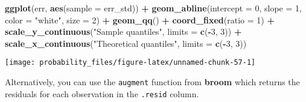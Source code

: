 \documentclass[]{book}
\newenvironment{Shaded}{\begin{snugshade}}{\end{snugshade}}
\newcommand{\DataTypeTok}[1]{\textcolor[rgb]{0.13,0.29,0.53}{#1}}
\newcommand{\DecValTok}[1]{\textcolor[rgb]{0.00,0.00,0.81}{#1}}
\newcommand{\KeywordTok}[1]{\textcolor[rgb]{0.13,0.29,0.53}{\textbf{#1}}}
\newcommand{\NormalTok}[1]{#1}
\newcommand{\OperatorTok}[1]{\textcolor[rgb]{0.81,0.36,0.00}{\textbf{#1}}}
\newcommand{\StringTok}[1]{\textcolor[rgb]{0.31,0.60,0.02}{#1}}
\theoremstyle{definition}
\theoremstyle{definition}
\theoremstyle{definition}
\theoremstyle{remark}
\begin{document}
\begin{Shaded}
\begin{Highlighting}[]
\KeywordTok{ggplot}\NormalTok{(err, }\KeywordTok{aes}\NormalTok{(}\DataTypeTok{sample =}\NormalTok{ err_std)) }\OperatorTok{+}
\StringTok{  }\KeywordTok{geom_abline}\NormalTok{(}\DataTypeTok{intercept =} \DecValTok{0}\NormalTok{, }\DataTypeTok{slope =} \DecValTok{1}\NormalTok{, }\DataTypeTok{color =} \StringTok{"white"}\NormalTok{, }\DataTypeTok{size =} \DecValTok{2}\NormalTok{) }\OperatorTok{+}
\StringTok{  }\KeywordTok{geom_qq}\NormalTok{() }\OperatorTok{+}
\StringTok{  }\KeywordTok{coord_fixed}\NormalTok{(}\DataTypeTok{ratio =} \DecValTok{1}\NormalTok{) }\OperatorTok{+}
\StringTok{  }\KeywordTok{scale_y_continuous}\NormalTok{(}\StringTok{"Sample quantiles"}\NormalTok{, }\DataTypeTok{limits =} \KeywordTok{c}\NormalTok{(}\OperatorTok{-}\DecValTok{3}\NormalTok{, }\DecValTok{3}\NormalTok{)) }\OperatorTok{+}
\StringTok{  }\KeywordTok{scale_x_continuous}\NormalTok{(}\StringTok{"Theoretical quantiles"}\NormalTok{, }\DataTypeTok{limits =} \KeywordTok{c}\NormalTok{(}\OperatorTok{-}\DecValTok{3}\NormalTok{, }\DecValTok{3}\NormalTok{))}
\end{Highlighting}
\end{Shaded}

\begin{center}\texttt{[image: probability\_files/figure-latex/unnamed-chunk-57-1]} \end{center}

Alternatively, you can use the \texttt{augment} function from
\textbf{broom} which returns the residuals for each observation in the
\texttt{.resid} column.

\begin{Shaded}
\end{Shaded}
\end{document}

